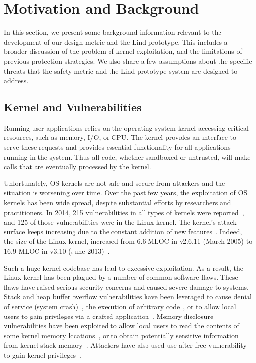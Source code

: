 \section{Motivation and Background}
\label{sec.motivation-and-background}

In this section, we present some background information 
relevant to the development of our design metric and the Lind prototype. 
This includes a broader discussion of the problem of kernel exploitation, 
and the limitations of previous protection strategies. 
We also share a few assumptions about the specific threats 
that the safety metric and the Lind prototype system are designed to
address.

\subsection{Kernel and Vulnerabilities}

Running user applications relies on the operating system kernel 
accessing critical resources, such as memory, I/O, or CPU. 
The kernel provides an interface to serve these requests 
and provides essential functionality for all applications running in the
system. 
Thus all code, whether sandboxed or untrusted, will make calls 
that are eventually processed by the kernel. 

Unfortunately, OS kernels are not safe and secure from
attackers and the situation is worsening over time. 
Over the past few years, the exploitation of OS kernels has been wide
spread, 
despite substantial efforts by researchers and practitioners. 
In 2014, 215 vulnerabilities in all types of kernels were reported~\cite{NVD}, 
and 125 of those vulnerabilities were in the Linux kernel. 
The kernel's
attack surface keeps increasing due to the constant addition of new
features~\cite{Metrics-13}. 
Indeed, the size of the Linux kernel, increased from 6.6 MLOC in v2.6.11 
(March 2005) to 16.9 MLOC in v3.10 (June 2013)~\cite{Linux-13}. 


Such a huge kernel codebase has lead to excessive exploitation. 
As a result, the Linux kernel has been plagued by a number of common
software flaws. 
These flaws have raised serious security concerns and caused severe damage
to systems. 
Stack and heap buffer overflow vulnerabilities have been leveraged to 
cause denial of service (system crash)~\cite{CVE-2013-2892}, 
the execution of arbitrary code~\cite{CVE-2009-3234}, 
or to allow local users to gain privileges via a crafted 
application~\cite{CVE-2013-1828}. 
Memory disclosure vulnerabilities have been exploited to allow local users
to read 
the contents of some kernel memory locations~\cite{CVE-2009-3002}, or to
obtain potentially 
sensitive information from kernel stack memory~\cite{CVE-2010-4073}. 
Attackers have also used use-after-free vulnerability to gain kernel
privileges~\cite{CVE-2013-4343}.

